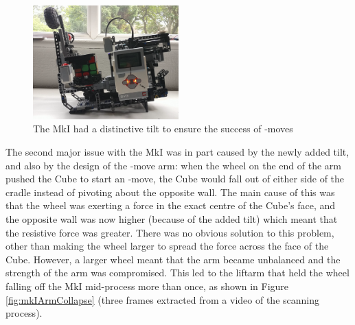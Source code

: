 \documentclass{report}
\newcommand{\move}[1]{\uppercase{\texttt{\formatmovesnospace{#1}}}-move}
\begin{document}
	\begin{figure}[H]
		\begin{center}
			\includegraphics[width=0.5\textwidth]{Resources/Images/imgCubeSolverV1.png}
			\caption{The MkI had a distinctive tilt to ensure the success of \move{x}s}
			\label{fig:imgCubeSolverV1}
		\end{center} 
	\end{figure}

	The second major issue with the MkI was in part caused by the newly added tilt, and also by the design of the \move{x} arm: when the wheel on the end of the arm pushed the Cube to start an \move{x}, the Cube would fall out of either side of the cradle instead of pivoting about the opposite wall. The main cause of this was that the wheel was exerting a force in the exact centre of the Cube's face, and the opposite wall was now higher (because of the added tilt) which meant that the resistive force was greater. There was no obvious solution to this problem, other than making the wheel larger to spread the force across the face of the Cube. However, a larger wheel meant that the arm became unbalanced and the strength of the arm was compromised. This led to the liftarm that held the wheel falling off the MkI mid-process more than once, as shown in Figure \ref{fig:mkIArmCollapse} (three frames extracted from a video of the scanning process).
\end{document}
